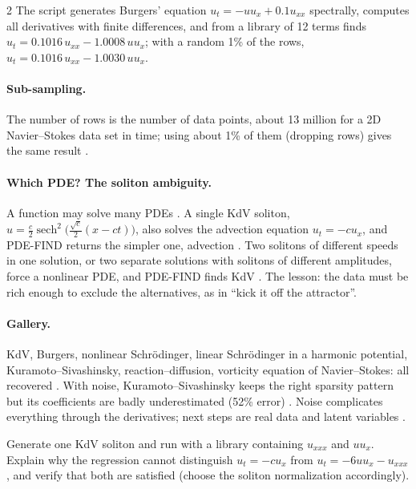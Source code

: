 \begin{paracol}{2}
The script generates Burgers' equation $u_t=-uu_x+0.1u_{xx}$ spectrally, computes all derivatives with
finite differences, and from a library of 12 terms finds $u_t=0.1016\,u_{xx}-1.0008\,uu_x$; with a random
1\% of the rows, $u_t=0.1016\,u_{xx}-1.0030\,uu_x$.

\paragraph{Sub-sampling.} The number of rows is the number of data points, about 13 million for a 2D
Navier--Stokes data set in time; using about 1\% of them (dropping rows) gives the same result
.

\paragraph{Which PDE? The soliton ambiguity.} A function may solve many PDEs . A single KdV
soliton, $u=\frac c2\operatorname{sech}^2\!\big(\frac{\sqrt c}{2}(x-ct)\big)$, also solves the advection
equation $u_t=-cu_x$, and PDE-FIND returns the simpler one, advection . Two solitons of
different speeds in one solution, or two separate solutions with solitons of different amplitudes, force a
nonlinear PDE, and PDE-FIND finds KdV . The lesson: the data must
be rich enough to exclude the alternatives, as in ``kick it off the attractor''.

\paragraph{Gallery.} KdV, Burgers, nonlinear Schr\"odinger, linear Schr\"odinger in a harmonic potential,
Kuramoto--Sivashinsky, reaction--diffusion, vorticity equation of Navier--Stokes: all recovered
. With noise, Kuramoto--Sivashinsky keeps the right sparsity pattern but its
coefficients are badly underestimated (52\% error) . Noise complicates everything through the
derivatives; next steps are real data and latent variables .

\begin{exercise}
Generate one KdV soliton and run  with a library containing $u_{xxx}$ and $uu_x$.
Explain why the regression cannot distinguish $u_t=-cu_x$ from $u_t=-6uu_x-u_{xxx}$, and verify that both
are satisfied (choose the soliton normalization accordingly).
\end{exercise}


\end{paracol}
